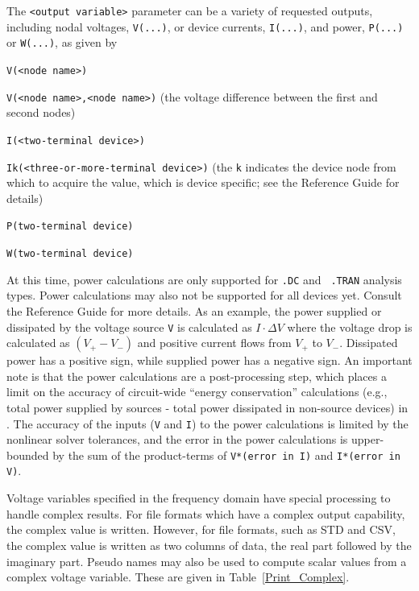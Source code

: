 The \texttt{<output variable>} parameter can be a variety of requested outputs,
including nodal voltages, {\tt V(...)}, or device currents, {\tt I(...)}, and power,
{\tt P(...)} or {\tt W(...)}, as given by
\begin{XyceItemize}
\item \texttt{V(<node name>)}
\item \texttt{V(<node name>,<node name>)} (the voltage difference between the first and second nodes)
\item \texttt{I(<two-terminal device>)}
\item \texttt{Ik(<three-or-more-terminal device>)} (the \texttt{k} indicates
  the device node from which to acquire the value, which is device specific;
  see the \Xyce{} Reference Guide\ReferenceGuide{} for details)
\item \texttt{P(two-terminal device)} 
\item \texttt{W(two-terminal device)}
\end{XyceItemize}

At this time, power calculations are only supported for {\tt .DC} and {\tt 
.TRAN} analysis types.  Power calculations may also not be supported for all \Xyce{}
devices yet.  Consult the \Xyce{} Reference Guide\ReferenceGuide{} for more details.
As an example, the power supplied or dissipated by the 
voltage source {\tt V} is calculated as $I \cdot \Delta V$ where the voltage drop is 
calculated as $(V_+ - V_-)$  and positive current flows from $V_+$ to $V_-$.  Dissipated power 
has a positive sign, while supplied power has a negative sign.  An important note is that
the power calculations are a post-processing step, which places a limit on the accuracy 
of circuit-wide ``energy conservation'' calculations (e.g., total power supplied by sources 
- total power dissipated in non-source devices) in \Xyce{}.  The accuracy of the inputs ({\tt V} and 
{\tt I}) to the power calculations is limited by the nonlinear solver tolerances, and the error
in the power calculations is upper-bounded by the sum of the product-terms of 
{\tt V*(error in I)} and {\tt I*(error in V)}.

Voltage variables specified in the frequency domain have special processing to
handle complex results.  For file formats which have a complex output
capability, the complex value is written.  However, for file formats, such as
STD and CSV, the complex value is written as two columns of data, the real part
followed by the imaginary part. Pseudo names may also be used to compute scalar
values from a complex voltage variable. These are given in
Table~\ref{Print_Complex}.

